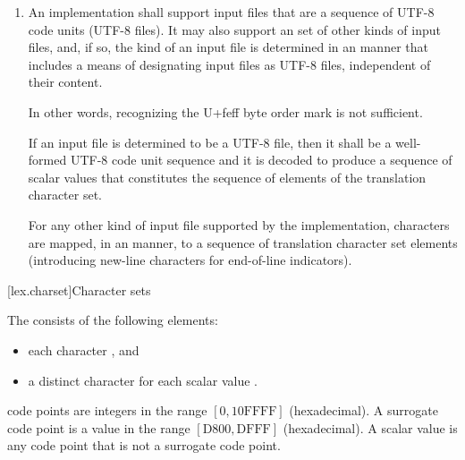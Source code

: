 \documentclass{wg21}
\newcommand{\replaceucs}{\changed{UCS}{Unicode}}
\begin{document}
\begin{enumerate}
    \item
    An implementation shall support input files
    that are a sequence of UTF-8 code units (UTF-8 files).
    It may also support
    an  set of other kinds of input files, and,
    if so, the kind of an input file is determined in
    an  manner
    that includes a means of designating input files as UTF-8 files,
    independent of their content.
    \begin{note}
        In other words,
        recognizing the U+feff byte order mark is not sufficient.
    \end{note}
    If an input file is determined to be a UTF-8 file,
    then it shall be a well-formed UTF-8 code unit sequence and
    it is decoded to produce a sequence of \replaceucs{} scalar values
    that constitutes the sequence of elements of the translation character set.

    For any other kind of input file supported by the implementation,
    characters are mapped, in an
     manner,
    to a sequence of translation character set elements
    (introducing new-line characters for end-of-line indicators).
\end{enumerate}

[lex.charset]{Character sets}

\pnum
{}%
The  consists of the following elements:
\begin{itemize}
    \item
    each  character , and
    \item
    a distinct character for each \replaceucs{} scalar value
    .
\end{itemize}
\begin{note}
     code points are integers
    in the range $[0, \mathrm{10FFFF}]$ (hexadecimal).
    A surrogate code point is a value
    in the range $[\mathrm{D800}, \mathrm{DFFF}]$ (hexadecimal).
    A \replaceucs{} scalar value is any code point that is not a surrogate code point.
\end{note}
\end{document}
